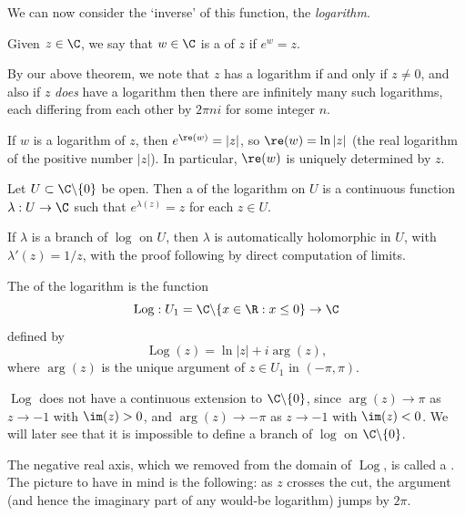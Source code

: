 We can now consider the `inverse' of this function, the \emph{logarithm}.

\begin{definition}[Logarithm]
    Given $z \in \C$, we say that $w \in \C$ is a  of $z$ if $e^w = z$.
\end{definition}

By our above theorem, we note that $z$ has a logarithm if and only if $z \neq 0$, and also if $z$ \emph{does} have a logarithm then there are infinitely many such logarithms, each differing from each other by $2 \pi n i$ for some integer $n$.

If $w$ is a logarithm of $z$, then $e^{\re(w)} = |z|$, so $\re(w) = \ln |z|$ (the real logarithm of the positive number $|z|$). In particular, $\re(w)$ is uniquely determined by $z$.

\begin{definition}
    Let $U \subset \C \backslash \{0\}$ be open. Then a  of the logarithm on $U$ is a continuous function $\lambda : U \rightarrow \C$ such that $e^{\lambda(z)} = z$ for each $z \in U$.
\end{definition}

\begin{remark}
    If $\lambda$ is a branch of $\log$ on $U$, then $\lambda$ is automatically holomorphic in $U$, with $\lambda'(z) = 1/z$, with the proof following by direct computation of limits.
\end{remark}

\begin{definition}
The  of the logarithm is the function
$$
\operatorname{Log}: U_1 = \C \backslash \{x \in \R : x \leq 0\} \rightarrow \C
$$
defined by
$$
\operatorname{Log}(z) = \ln|z| + i \arg(z),
$$
where $\arg(z)$ is the unique argument of $z \in U_1$ in $(-\pi, \pi)$.
\end{definition}

\begin{remark}
    $\operatorname{Log}$ does not have a continuous extension to $\C \backslash \{0\}$, since $\arg(z) \rightarrow \pi$ as $z \rightarrow -1$ with $\im(z) > 0$, and $\arg(z) \rightarrow -\pi$ as $z \rightarrow -1$ with $\im (z) < 0$. We will later see that it is impossible to define a branch of $\log$ on $\C \backslash \{0\}$.
\end{remark}

The negative real axis, which we removed from the domain of $\operatorname{Log}$, is called a . The picture to have in mind is the following: as $z$ crosses the cut, the argument (and hence the imaginary part of any would-be logarithm) jumps by $2\pi$.


